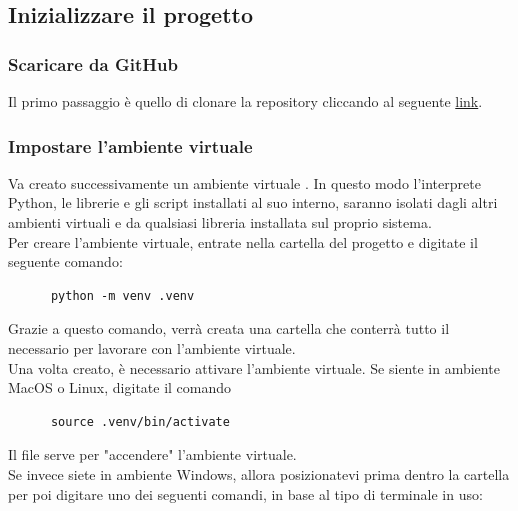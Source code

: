 \documentclass[12pt, letterpaper]{article}
\begin{document}
\subsection{Inizializzare il progetto}

\subsubsection{Scaricare da GitHub}

Il primo passaggio è quello di clonare la repository cliccando al seguente
\href{https://github.com/Stefano-Labianca/smart-energy-controller}{link}. \\

\subsubsection{Impostare l'ambiente virtuale}

\noindent Va creato successivamente un ambiente virtuale \cite{create-venv}. In questo modo l'interprete Python,
le librerie e gli script installati al suo interno, saranno isolati dagli altri ambienti
virtuali e da qualsiasi libreria installata sul proprio sistema. \\

\noindent Per creare l'ambiente virtuale, entrate nella cartella del progetto e
digitate il seguente comando:

\begin{verbatim}
      python -m venv .venv
\end{verbatim}


\noindent Grazie a questo comando, verrà creata una cartella  che conterrà tutto il
necessario per lavorare con l'ambiente virtuale. \\

\noindent Una volta creato, è necessario attivare l'ambiente virtuale.
Se siente in ambiente MacOS o Linux, digitate il comando

\begin{verbatim}
      source .venv/bin/activate
\end{verbatim}

\noindent Il file  serve per "accendere" l'ambiente virtuale. \\

\noindent Se invece siete in ambiente Windows, allora posizionatevi prima dentro la cartella
 per poi  digitare uno dei seguenti comandi, in base al tipo di terminale in uso:
\end{document}
